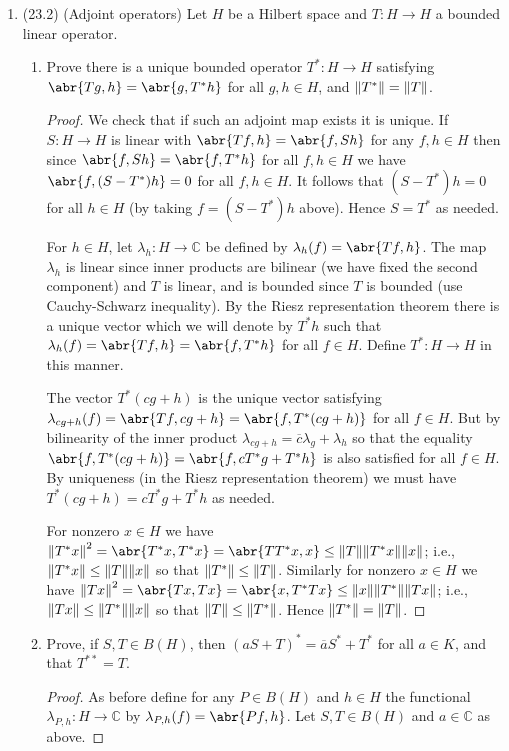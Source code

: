 \documentclass[11pt]{article}
\begin{document}
\begin{enumerate}
    \item (23.2) (Adjoint operators) Let $H$ be a Hilbert space and $T\colon H\to H$ a bounded linear operator. \begin{enumerate}
      \item Prove there is a unique bounded operator $T^\ast\colon H\to H$ satisfying $\abr{Tg,h}= \abr{g,T^\ast h}$ for all $g,h\in H$, and $\norm{T^\ast} = \norm{T}$. \begin{proof}
        We check that if such an adjoint map exists it is unique. If $S\colon H\to H$ is linear with $\abr{Tf,h} = \abr{f,Sh}$ for any $f,h\in H$ then since $\abr{f,Sh} = \abr{f,T^\ast h}$ for all $f,h\in H$ we have $\abr{f,(S-T^\ast)h} = 0$ for all $f,h\in H$. It follows that $(S-T^\ast)h = 0$ for all $h\in H$ (by taking $f = (S-T^\ast)h$ above). Hence $S = T^\ast$ as needed.
        
        For $h\in H$, let $\lambda_h\colon H\to \mathbb{C}$ be defined by $\lambda_h(f) = \abr{Tf,h}$. The map $\lambda_h$ is linear since inner products are bilinear (we have fixed the second component) and $T$ is linear, and is bounded since $T$ is bounded (use Cauchy-Schwarz inequality). By the Riesz representation theorem there is a unique vector which we will denote by $T^\ast h$ such that $\lambda_h(f) = \abr{Tf,h} = \abr{f,T^\ast h}$ for all $f\in H$. Define $T^\ast\colon H\to H$ in this manner.

        The vector $T^\ast(cg+h)$ is the unique vector satisfying $\lambda_{cg+h}(f) = \abr{Tf,cg+h} = \abr{f,T^\ast(cg+h)}$ for all $f\in H$. But by bilinearity of the inner product $\lambda_{cg+h} = \overline{c}\lambda_g+\lambda_h$ so that the equality $\abr{f,T^\ast(cg+h)} = \abr{f,cT^\ast g+T^\ast h}$ is also satisfied for all $f\in H$. By uniqueness (in the Riesz representation theorem) we must have $T^\ast(cg+h)=cT^\ast g+T^\ast h$ as needed.
        
        For nonzero $x\in H$ we have $\norm{T^\ast x}^2 = \abr{T^\ast x, T^\ast x} = \abr{TT^\ast x,x}\leq \norm{T}\norm{T^\ast x}\norm{x}$; i.e., $\norm{T^\ast x}\leq \norm{T}\norm{x}$ so that $\norm{T^\ast}\leq \norm{T}$. Similarly for nonzero $x\in H$ we have $\norm{Tx}^2 = \abr{Tx,Tx} = \abr{x,T^\ast Tx}\leq \norm{x}\norm{T^\ast}\norm{Tx}$; i.e., $\norm{T x}\leq \norm{T^\ast}\norm{x}$ so that $\norm{T}\leq \norm{T^\ast}$. Hence $\norm{T^\ast} = \norm{T}$.
      \end{proof}
      \item Prove, if $S,T\in B(H)$, then $(aS+T)^\ast = \overline{a}S^\ast + T^\ast$ for all $a\in K$, and that $T^{\ast\ast} = T$. \begin{proof}
        As before define for any $P\in B(H)$ and $h\in H$ the functional $\lambda_{P,h}\colon H\to \mathbb{C}$ by $\lambda_{P,h}(f) = \abr{Pf, h}$. Let $S,T\in B(H)$ and $a\in \mathbb{C}$ as above.


\end{proof}
\end{enumerate}
\end{enumerate}
\end{document}
